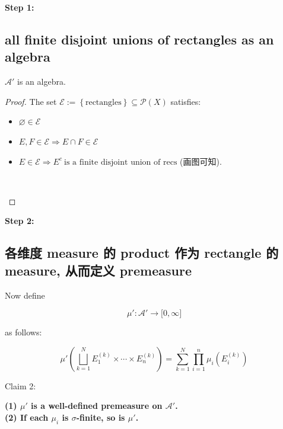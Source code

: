 \documentclass{qlnotes-export}
\begin{document}
\textbf{Step 1:}

\subsection{all finite disjoint unions of rectangles as an algebra}\label{all-finite-disjoint-unions-of-rectangles-as-an-algebra}

\begin{proposition}

\(\mathcal{A}'\) is an algebra.

\end{proposition}

\begin{proof}

The set \(\mathcal{E} := \left\{ \text{rectangles} \right\} \subseteq \mathcal{P}(X)\) satisfies:

\begin{itemize}
\item
  \(\varnothing \in \mathcal{E}\)
\item
  \(E,F \in \mathcal{E}\Longrightarrow E \cap F \in \mathcal{E}\)
\item
  \(E \in \mathcal{E}\Longrightarrow E^{c}\ \text{is a finite disjoint union of recs}\) (画图可知).\\
  \strut \\
\end{itemize}

\end{proof}

\textbf{Step 2:}

\subsection{各维度 measure 的 product 作为 rectangle 的 measure, 从而定义 premeasure}\label{ux5404ux7ef4ux5ea6-measure-ux7684-product-ux4f5cux4e3a-rectangle-ux7684-measure-ux4eceux800cux5b9aux4e49-premeasure}

Now define

\[\mu':\mathcal{A}'\rightarrow\lbrack 0,\infty\rbrack\]

as follows:

\[\mu'(\bigsqcup\limits_{k = 1}^{N}E_{1}^{(k)} \times \cdots \times E_{n}^{(k)}) = \sum\limits_{k = 1}^{N}\prod\limits_{i = 1}^{n}\mu_{i}(E_{i}^{(k)})\]

Claim 2:

\begin{proposition}

\textbf{(1) \(\mu'\) is a well-defined premeasure on \(\mathcal{A}'\).\\
(2) If each \(\mu_{i}\) is \(\sigma\)-finite, so is \(\mu'\).}

\end{proposition}
\end{document}
